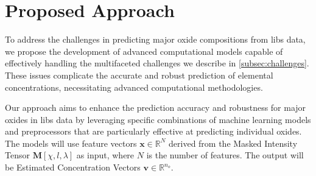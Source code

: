 \section{Proposed Approach}
To address the challenges in predicting major oxide compositions from \gls{libs} data, we propose the development of advanced computational models capable of effectively handling the multifaceted challenges we describe in \ref{subsec:challenges}.
These issues complicate the accurate and robust prediction of elemental concentrations, necessitating advanced computational methodologies. 

Our approach aims to enhance the prediction accuracy and robustness for major oxides in \gls{libs} data by leveraging specific combinations of machine learning models and preprocessors that are particularly effective at predicting individual oxides.
The models will use feature vectors $\mathbf{x} \in \mathbb{R}^N$ derived from the Masked Intensity Tensor $\mathbf{M}[\chi, l, \lambda]$ as input, where $N$ is the number of features. 
The output will be Estimated Concentration Vectors $\mathbf{v} \in \mathbb{R}^{n_o}$.

